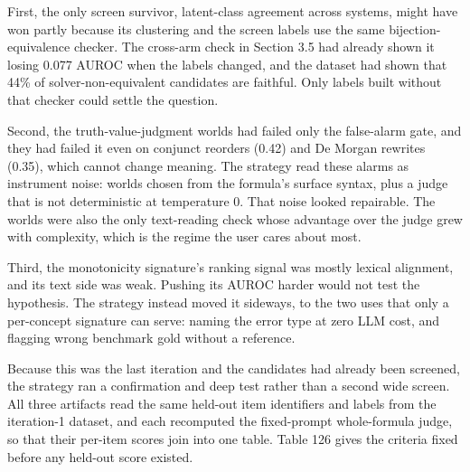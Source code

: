\documentclass[11pt,letterpaper]{article}
\begin{document}
First, the only screen survivor, latent-class agreement across systems, might have won partly because its clustering and the screen labels use the same bijection-equivalence checker. The cross-arm check in Section 3.5 had already shown it losing 0.077 AUROC when the labels changed, and the dataset had shown that 44\% of solver-non-equivalent candidates are faithful. Only labels built without that checker could settle the question.

Second, the truth-value-judgment worlds had failed only the false-alarm gate, and they had failed it even on conjunct reorders (0.42) and De Morgan rewrites (0.35), which cannot change meaning. The strategy read these alarms as instrument noise: worlds chosen from the formula's surface syntax, plus a judge that is not deterministic at temperature 0. That noise looked repairable. The worlds were also the only text-reading check whose advantage over the judge grew with complexity, which is the regime the user cares about most.

Third, the monotonicity signature's ranking signal was mostly lexical alignment, and its text side was weak. Pushing its AUROC harder would not test the hypothesis. The strategy instead moved it sideways, to the two uses that only a per-concept signature can serve: naming the error type at zero LLM cost, and flagging wrong benchmark gold without a reference.

Because this was the last iteration and the candidates had already been screened, the strategy ran a confirmation and deep test rather than a second wide screen. All three artifacts read the same held-out item identifiers and labels from the iteration-1 dataset, and each recomputed the fixed-prompt whole-formula judge, so that their per-item scores join into one table. Table 126 gives the criteria fixed before any held-out score existed.
\end{document}
